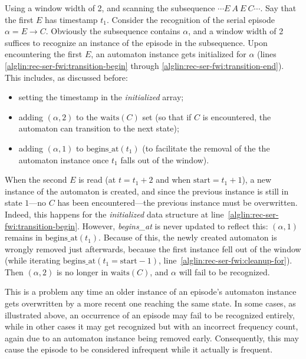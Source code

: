 Using a window width of 2, and scanning the subsequence $ \cdots E \: A \: E \: C \cdots $. Say that the first $ E $ has timestamp $ t_1 $. Consider the recognition of the serial episode $ \alpha = E \to C $. Obviously the subsequence contains $ \alpha $, and a window width of 2 suffices to recognize an instance of the episode in the subsequence. Upon encountering the first $ E $, an automaton instance gets initialized for $ \alpha $ (lines \ref{alglin:rec-ser-fwi:transition-begin} through \ref{alglin:rec-ser-fwi:transition-end}). This includes, as discussed before:
\begin{itemize}
\item setting the timestamp in the \emph{initialized} array;
\item adding $ (\alpha, 2) $ to the $ \text{waits}(C) $ set (so that if $ C $ is encountered, the automaton can transition to the next state);
\item adding $ (\alpha, 1) $ to $ \text{begins\_at}(t_1) $ (to facilitate the removal of the the automaton instance once $ t_1 $ falls out of the window).
\end{itemize}

When the second $ E $ is read (at $ t = t_1 + 2 $ and when $ \text{start} = t_1 + 1 $), a new instance of the automaton is created, and since the previous instance is still in state $ 1 $---no $ C $ has been encountered---the previous instance must be overwritten. Indeed, this happens for the \emph{initialized} data structure at line~\ref{alglin:rec-ser-fwi:transition-begin}. However, \emph{begins\_at} is never updated to reflect this: $ (\alpha, 1) $ remains in $ \text{begins\_at}(t_1) $. Because of this, the newly created automaton is wrongly removed just afterwards, because the first instance fell out of the window (while iterating $ \text{begins\_at}(t_1 = \text{start} - 1) $, line~\ref{alglin:rec-ser-fwi:cleanup-for}). Then $ (\alpha, 2) $ is no longer in $ \text{waits}(C) $, and $ \alpha $ will fail to be recognized.

This is a problem any time an older instance of an episode's automaton instance gets overwritten by a more recent one reaching the same state. In some cases, as illustrated above, an occurrence of an episode may fail to be recognized entirely, while in other cases it may get recognized but with an incorrect frequency count, again due to an automaton instance being removed early. Consequently, this may cause the episode to be considered infrequent while it actually is frequent.

